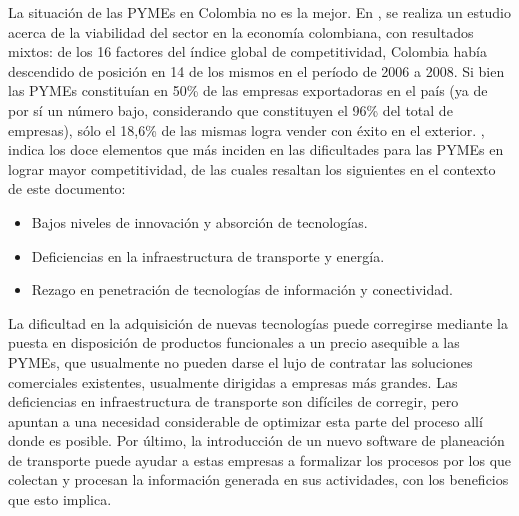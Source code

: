 \message{ !name(proposal.tex)}\documentclass[12pt]{extarticle}
\begin{document}

La situación de las PYMEs en Colombia no es la mejor. En \cite[págs.
109-111]{r_situacion_2010}, se realiza un estudio acerca de la viabilidad del
sector en la economía colombiana, con resultados mixtos: de los 16 factores del
índice global de competitividad, Colombia había descendido de posición en 14 de
los mismos en el período de 2006 a 2008. Si bien las PYMEs constituían en 50\%
de las empresas exportadoras en el país (ya de por sí un número bajo,
considerando que constituyen el 96\% del total de empresas), sólo el 18,6\% de
las mismas logra vender con éxito en el exterior. \cite[pág.
110]{r_situacion_2010}, indica los doce elementos que más inciden en las
dificultades para las PYMEs en lograr mayor competitividad, de las cuales
resaltan los siguientes en el contexto de este documento: 
\begin{itemize}
\item Bajos niveles de innovación y absorción de tecnologías.
\item Deficiencias en la infraestructura de transporte y energía.
\item Rezago en penetración de tecnologías de información y conectividad.
\end{itemize}
La dificultad en la adquisición de nuevas tecnologías puede corregirse mediante
la puesta en disposición de productos funcionales a un precio asequible a las
PYMEs, que usualmente no pueden darse el lujo de contratar las soluciones
comerciales existentes, usualmente dirigidas a empresas más grandes. Las
deficiencias en infraestructura de transporte son difíciles de corregir, pero
apuntan a una necesidad considerable de optimizar esta parte del proceso allí
donde es posible. Por último, la introducción de un nuevo software de planeación
de transporte puede ayudar a estas empresas a formalizar los procesos por los
que colectan y procesan la información generada en sus actividades, con los
beneficios que esto implica.\cite[pág. 93]{premkumar_meta-analysis_2003}
\end{document}
